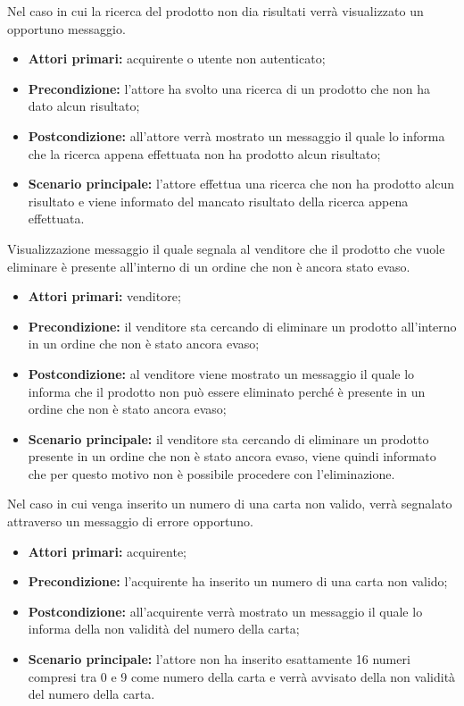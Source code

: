 
Nel caso in cui la ricerca del prodotto non dia risultati verrà visualizzato un opportuno messaggio.
\begin{itemize}
	\item \textbf{Attori primari:} acquirente o utente non autenticato;
	\item \textbf{Precondizione:} l'attore ha svolto una ricerca di un prodotto che non ha dato alcun risultato;
	\item \textbf{Postcondizione:} all'attore verrà mostrato un messaggio il quale lo informa che la ricerca appena effettuata non ha prodotto alcun risultato;
	\item \textbf{Scenario principale:} l'attore effettua una ricerca che non ha prodotto alcun risultato e viene informato del mancato risultato della ricerca appena effettuata.
\end{itemize}

Visualizzazione messaggio il quale segnala al venditore che il prodotto che vuole eliminare è presente all'interno di un ordine che non è ancora stato evaso.
\begin{itemize}
    \item \textbf{Attori primari:} venditore;
    \item \textbf{Precondizione:} il venditore sta cercando di eliminare un prodotto all'interno in un ordine che non è stato ancora evaso;
    \item \textbf{Postcondizione:} al venditore viene mostrato un messaggio il quale lo informa che il prodotto non può essere eliminato perché è presente in un ordine che non è stato ancora evaso;
    \item \textbf{Scenario principale:} il venditore sta cercando di eliminare un prodotto presente in un ordine che non è stato ancora evaso, viene quindi informato che per questo motivo non è possibile procedere con l'eliminazione.
\end{itemize}

Nel caso in cui venga inserito un numero di una carta non valido, verrà segnalato attraverso un messaggio di errore opportuno.
\begin{itemize}
	\item \textbf{Attori primari:} acquirente;
	\item \textbf{Precondizione:} l'acquirente ha inserito un numero di una carta non valido;
	\item \textbf{Postcondizione:} all'acquirente verrà mostrato un messaggio il quale lo informa della non validità del numero della carta;
	\item \textbf{Scenario principale:} l'attore non ha inserito esattamente 16 numeri compresi tra 0 e 9 come numero della carta e verrà avvisato della non validità del numero della carta.
\end{itemize}

